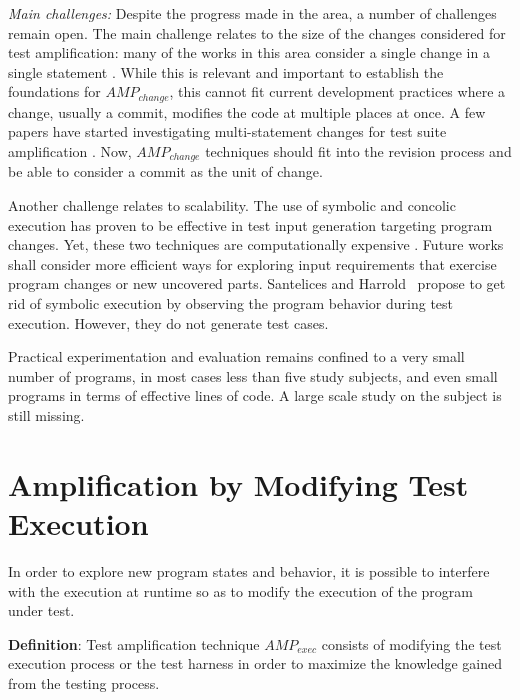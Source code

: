 \emph{Main challenges:}
Despite the progress made in the area, a number of challenges remain open. 
The main challenge relates to the size of the changes considered for test amplification: many of the works in this area consider a single change in a single statement \cite{apiwattanapong2006matrix,qi2010test,xwang2014directed}. 
While this is relevant and important to establish the foundations for $AMP_{change}$, this cannot fit current development practices where a change, usually a commit, modifies the code at multiple places at once. 
A few papers have started investigating multi-statement changes for test suite amplification \cite{santelices2008test,marinescu2013katch,palikareva2016shadow}. 
Now, $AMP_{change}$ techniques should fit into the revision process and be able to consider a commit as the unit of change. 

Another challenge relates to scalability. 
The use of symbolic and concolic execution has proven to be effective in test input generation targeting program changes. 
Yet, these two techniques are computationally expensive \cite{xu2009directed,xu2011hybrid,xu2015directed,apiwattanapong2006matrix,santelices2008test,palikareva2016shadow}. 
Future works shall consider more efficient ways for exploring input requirements that  exercise program changes or new uncovered parts. 
Santelices and Harrold~\cite{santelices2011applying} propose to get rid of symbolic execution by observing the program behavior during test execution. 
However, they do not generate test cases.

Practical experimentation and evaluation remains confined to a very small number of programs, in most cases less than five study subjects, and even small programs in terms of effective lines of code. 
A large scale study on the subject is still missing.

\section{Amplification by Modifying Test Execution}
\label{sec:sota:category-3}

In order to explore new program states and behavior, it is possible to interfere with the execution at runtime so as to modify the execution of the program under test. 

\medskip
\begin{mdframed}
\textbf{Definition}: Test amplification technique $AMP_{exec}$ consists of modifying the test execution process or the test harness in order to maximize the knowledge gained from the testing process.
\end{mdframed}

